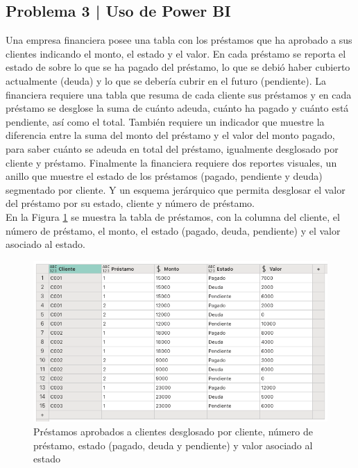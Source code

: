\documentclass{article}
\begin{document}
\clearpage

\subsection*{Problema 3 | Uso de Power BI}

Una empresa financiera posee una tabla con los préstamos que ha aprobado a sus clientes indicando el monto, el estado y el valor. En cada préstamo se reporta el estado de sobre lo que se ha pagado del préstamo, lo que se debió haber cubierto actualmente (deuda) y lo que se debería cubrir en el futuro (pendiente). La financiera requiere una tabla que resuma de cada cliente sus préstamos y en cada préstamo se desglose la suma de cuánto adeuda, cuánto ha pagado y cuánto está pendiente, así como el total. También requiere un indicador que muestre la diferencia entre la suma del monto del préstamo y el valor del monto pagado, para saber cuánto se adeuda en total del préstamo, igualmente desglosado por cliente y préstamo. Finalmente la financiera requiere dos reportes visuales, un anillo que muestre el estado de los préstamos (pagado, pendiente y deuda) segmentado por cliente. Y un esquema jerárquico que permita desglosar el valor del préstamo por su estado, cliente y número de préstamo.
\\[12pt]
En la Figura \ref{fig:p103} se muestra la tabla de préstamos, con la columna del cliente, el número de préstamo, el monto, el estado (pagado, deuda, pendiente) y el valor asociado al estado.
\begin{figure}[!h]
    \centering
    \begin{minipage}{\textwidth}
        \centering
        \includegraphics[width=\textwidth]{figures/p103.png}
    \end{minipage}
    \captionsetup{width=0.9\textwidth}
    \caption{Préstamos aprobados a clientes desglosado por cliente, número de préstamo, estado (pagado, deuda y pendiente) y valor asociado al estado}
    \label{fig:p103}
\end{figure}
\\
\end{document}
